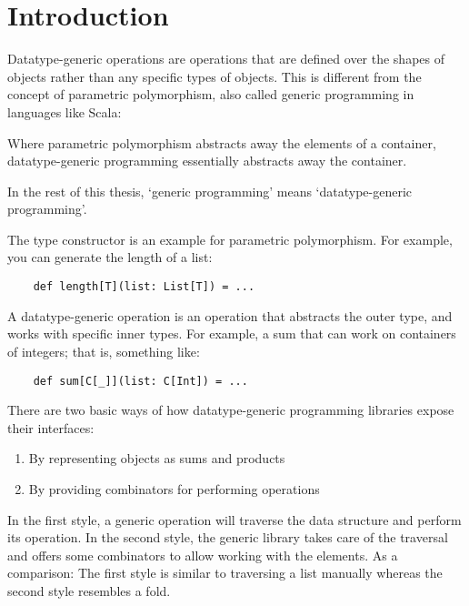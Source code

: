 \chapter{Introduction}
Datatype-generic operations are operations that are defined over the shapes
of objects rather than any specific types of objects. This is different from
the concept of parametric polymorphism, also called generic programming in
languages like Scala:

Where parametric polymorphism abstracts away the elements of a container,
datatype-generic programming essentially abstracts away the container.

In the rest of this thesis, `generic programming' means `datatype-generic
programming'.


\begin{example}
The type constructor  is an example for parametric polymorphism. For
example, you can generate the length of a list:

\begin{lstlisting}
    def length[T](list: List[T]) = ...
\end{lstlisting}
\end{example}

\begin{example}
A datatype-generic operation is an operation that abstracts the outer type, and
works with specific inner types. For example, a sum that can work on containers
of integers; that is, something like:
\begin{lstlisting}
    def sum[C[_]](list: C[Int]) = ...
\end{lstlisting}
\end{example}

There are two basic ways of how datatype-generic programming libraries expose
their interfaces:

\begin{enumerate}
    \item By representing objects as sums and products
    \item By providing combinators for performing operations
\end{enumerate}

In the first style, a generic operation will traverse the data structure and
perform its operation. In the second style, the generic library takes care of
the traversal and offers some combinators to allow working with the elements.
As a comparison: The first style is similar to traversing a list manually whereas
the second style resembles a fold.

